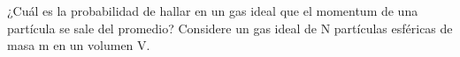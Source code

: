 ¿Cuál es la probabilidad de hallar en un gas ideal que el momentum de una partícula se sale
del promedio? Considere un gas ideal de N partículas esféricas de masa m en un volumen V.